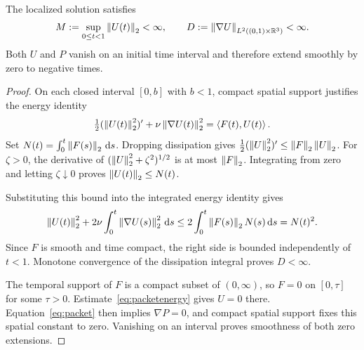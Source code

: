 \begin{lemma}\label{lem:packetenergy}
The localized solution satisfies
\[
 M:=\sup_{0\le t<1}\left\lVert U(t)\right\rVert_2<\infty,\qquad
 D:=\left\lVert\nabla U\right\rVert_{L^2((0,1)\times\mathbb R^3)}<\infty.
\]
Both $U$ and $P$ vanish on an initial time interval and therefore extend smoothly by zero to negative times.
\end{lemma}
\begin{proof}
On each closed interval $[0,b]$ with $b<1$, compact spatial support justifies the energy identity
\[
 \tfrac12(\left\lVert U(t)\right\rVert_2^2)'
 +\nu\left\lVert\nabla U(t)\right\rVert_2^2=\left\langle F(t),U(t)\right\rangle.
\]
Set $N(t)=\int_0^t\left\lVert F(s)\right\rVert_2\,\mathrm d s$. Dropping dissipation gives
$\tfrac12(\left\lVert U\right\rVert_2^2)'\le\left\lVert F\right\rVert_2\left\lVert U\right\rVert_2$.
For $\zeta>0$, the derivative of $(\left\lVert U\right\rVert_2^2+\zeta^2)^{1/2}$ is at most $\left\lVert F\right\rVert_2$. Integrating from zero and letting $\zeta\downarrow0$ proves $\left\lVert U(t)\right\rVert_2\le N(t)$.

Substituting this bound into the integrated energy identity gives
\begin{equation}\label{eq:packetenergy}
 \left\lVert U(t)\right\rVert_2^2+2\nu\int_0^t\left\lVert\nabla U(s)\right\rVert_2^2\,\mathrm d s
 \le 2\int_0^t\left\lVert F(s)\right\rVert_2N(s)\,\mathrm d s=N(t)^2.
\end{equation}
Since $F$ is smooth and time compact, the right side is bounded independently of $t<1$. Monotone convergence of the dissipation integral proves $D<\infty$.

The temporal support of $F$ is a compact subset of $(0,\infty)$, so $F=0$ on $[0,\tau]$ for some $\tau>0$. Estimate~\eqref{eq:packetenergy} gives $U=0$ there. Equation~\eqref{eq:packet} then implies $\nabla P=0$, and compact spatial support fixes this spatial constant to zero. Vanishing on an interval proves smoothness of both zero extensions.
\end{proof}
